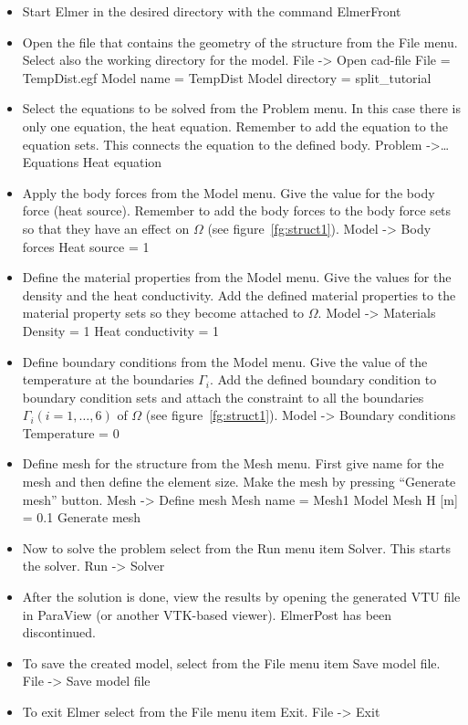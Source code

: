 \begin{itemize}
\item Start Elmer in the desired directory with the command
\ttbegin
ElmerFront
\ttend
\item Open the file that contains the geometry of the structure from 
the File menu. Select also the working directory for the model.
\ttbegin
File -> Open cad-file 
  File = TempDist.egf 
  Model name = TempDist 
  Model directory = split_tutorial
\ttend
\item Select the equations to be solved from the Problem menu. In this 
case there is only one equation, the heat equation. Remember to add the 
equation to the equation sets. This connects the equation to the defined 
body. 
\ttbegin
Problem ->\ldots Equations 
  Heat equation 
\ttend
\item Apply the body forces from the Model menu. Give the value for the body 
force (heat source). Remember to add the body forces to the body force 
sets so that they have an effect on $\Omega$ (see figure~\ref{fg:struct1}). 
\ttbegin
Model -> Body forces 
  Heat source = 1
\ttend
\item Define the material properties from the Model menu. Give the values for 
the density and the heat conductivity. Add the defined material properties 
to the material property sets so they become attached to $\Omega$. 
\ttbegin
Model -> Materials 
  Density = 1 
  Heat conductivity = 1
\ttend
\item Define boundary conditions from the Model menu. Give the value of the 
temperature at the boundaries $\Gamma_i$. Add the defined boundary condition 
to boundary condition sets and attach the constraint to all the boundaries 
$\Gamma_i (i=1,\ldots,6)$ of $\Omega$ (see figure~\ref{fg:struct1}). 
\ttbegin
Model -> Boundary conditions 
  Temperature = 0 
\ttend
\item Define mesh for the structure from the Mesh menu. First give name for 
the mesh and then define the element size. Make the mesh by pressing
``Generate mesh'' button. 
\ttbegin
Mesh -> Define mesh 
  Mesh name = Mesh1 
  Model Mesh H [m] = 0.1 
  Generate mesh
\ttend
\item Now to solve the problem select from the Run menu item Solver. This 
starts the solver. 
\ttbegin
Run -> Solver 
\ttend
\item After the solution is done, view the results by opening the generated
VTU file in ParaView (or another VTK-based viewer). ElmerPost has been
discontinued.
\item To save the created model, select from the File menu item Save 
model file. 
\ttbegin
File -> Save model file 
\ttend
\item To exit Elmer select from the File menu item Exit. 
\ttbegin
File -> Exit
\ttend
\end{itemize}

